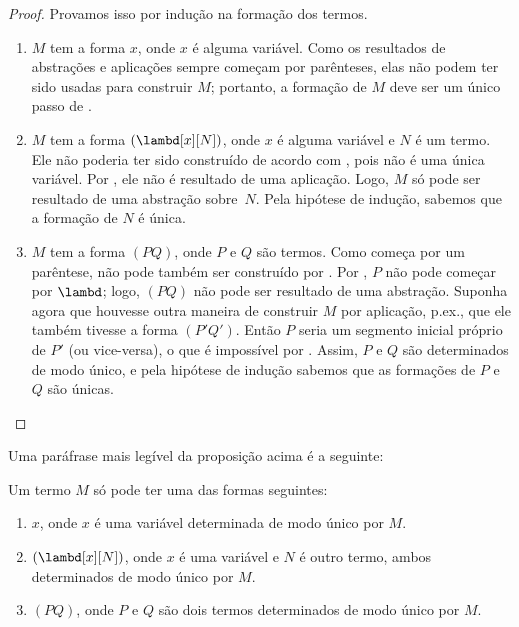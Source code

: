 \documentclass[../../../include/open-logic-section]{subfiles}
\begin{document}
\begin{proof}
  Provamos isso por indução na formação dos termos.
  \begin{enumerate}
    \item $M$ tem a forma $x$, onde $x$ é alguma variável. Como os resultados
      de abstrações e aplicações sempre começam por parênteses, elas não
      podem ter sido usadas para construir $M$; portanto, a formação de $M$
      deve ser um único passo de
      .
    \item $M$ tem a forma $(\lambd[x][N])$, onde $x$ é alguma variável e
      $N$ é um termo. Ele não poderia ter sido construído de acordo com
      , pois não é uma única
      variável. Por , ele não é resultado de uma
      aplicação. Logo, $M$ só pode ser resultado de uma abstração sobre~$N$.
      Pela hipótese de indução, sabemos que a formação de $N$ é única.
    \item $M$ tem a forma $(PQ)$, onde $P$ e $Q$ são termos. Como começa por
      um parêntese, não pode também ser construído por
      . Por
      , $P$ não pode começar por $\lambd$; logo,
      $(PQ)$ não pode ser resultado de uma abstração. Suponha agora que
      houvesse outra maneira de construir $M$ por aplicação, p.ex.,
      que ele também tivesse a forma $(P'Q')$. Então $P$ seria um segmento
      inicial próprio de $P'$ (ou vice-versa), o que é impossível por
      . Assim, $P$ e $Q$ são determinados de modo único,
      e pela hipótese de indução sabemos que as formações de $P$ e $Q$ são
      únicas.
  \end{enumerate}
\end{proof}

Uma paráfrase mais legível da proposição acima é a seguinte:
\begin{prop}
  Um termo $M$ só pode ter uma das formas seguintes:
  \begin{enumerate}
    \item $x$, onde $x$ é uma variável determinada de modo único por $M$.
    \item $(\lambd[x][N])$, onde $x$ é uma variável e $N$ é outro termo,
      ambos determinados de modo único por $M$.
    \item $(PQ)$, onde $P$ e $Q$ são dois termos determinados de modo único
      por $M$.
  \end{enumerate}
\end{prop}
\end{document}
